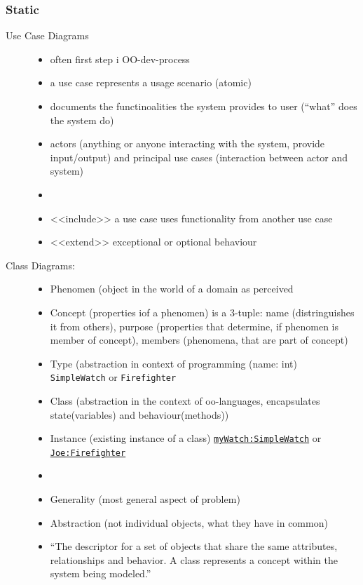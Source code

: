 \documentclass[a4paper, 10pt]{article}
\begin{document}
\subsubsection{Static}
\begin{description}
	\item[Use Case Diagrams]
	\begin{itemize}
		\item often first step i OO-dev-process
		\item a use case represents a usage scenario (atomic)
		\item documents the functinoalities the system provides to user (``what'' does the system do)
		\item actors (anything or anyone interacting with the system, provide input/output) and principal use cases (interaction between actor and system)
		\item 
		\item <<include>> \follows a use case uses functionality from another use case
		\item <<extend>> \follows exceptional or optional behaviour
	\end{itemize}
	\item[Class Diagrams:]
	\begin{itemize}
		\item Phenomen (object in the world of a domain as perceived
		\item Concept (properties iof a phenomen) is a 3-tuple: name (distringuishes it from others), purpose (properties that determine, if phenomen is member of concept), members (phenomena, that are part of concept)
		\item Type (abstraction in context of programming (name: int) \\
		\texttt{SimpleWatch} or \texttt{Firefighter}
		\item Class (abstraction in the context of oo-languages, encapsulates state(variables) and behaviour(methods))
		\item Instance (existing instance of a class) \underline{\texttt{myWatch:SimpleWatch}} or \underline{\texttt{Joe:Firefighter}}
		\item 
		\item Generality (most general aspect of problem)
		\item Abstraction (not individual objects, what they have in common)
		\item 		``The descriptor for a set of objects that share the same attributes, relationships and behavior. A class represents a concept within the system being modeled.''

\end{itemize}
\end{description}
\end{document}
